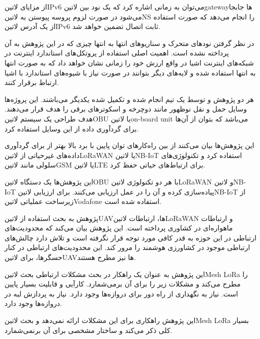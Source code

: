 از مزایای ‌لاتین{IPv6} می‌توان به زمانی اشاره کرد که یک نود بین ‌لاتین{gateway}ها جابجا می‌شود در صورت لزوم پروسه پیوستن به ‌لاتین{NS} را انجام می‌دهد که صورت استفاده از یک آدرس ‌لاتین{IPv6} ثابت اتصال تضمین خواهد شد.

در نظر گرفتن نودهای متحرک و سناریوهای انتها به انتها چیزی که در این پژوهش به آن پرداخته نشده است. اهمیت اصلی استفاده از پروتکل‌های استاندارد اینترنت در شبکه‌های اینترنت اشیا
در واقع ارزش خود را زمانی نشان خواهد داد که به صورت انتها به انتها استفاده شده و لایه‌های دیگر بتوانند در صورت نیاز با شیوه‌های استاندارد با اشیا ارتباط برقرار کنند.



هر دو پژوهش  و  توسط یک تیم انجام شده و تکمیل شده یکدیگر می‌باشند. این پروژه‌ها وسایل حمل و نقل نوظهور مانند دوچرخه و اسکوترهای برقی را هدف قرار می‌دهند.
هدف طراحی یک سیستم ‌لاتین{OBU} یا ‌لاتین{on-board unit} می‌باشد که بتوان از آن‌ها برای گردآوری داده از این وسایل استفاده کرد.

این پژوهش‌ها بیان می‌کنند از بین راه‌کارهای توان پایین با برد بالا بهتر از برای گردآوری داده‌های غیرحیاتی از ‌لاتین{LoRaWAN} یا ‌لاتین{NB-IoT} استفاده کرد
و تکنولوژی‌های سلولی مانند ‌لاتین{GSM} یا ‌لاتین{LTE} برای ارتباط‌های حیاتی حفظ کرد.

این پژوهش‌ها یک دستگاه ‌لاتین{OBU} با هر دو تکنولوژی ‌لاتین{LoRaWAN} و ‌لاتین{NB-IoT} پیاده‌سازی کرده و آن را در عمل ارزیابی می‌کنند.
برای ارزیابی ‌لاتین{NB-IoT} از زیرساخت عملیاتی ‌لاتین{Vodafone} استفاده شده است.


پژوهش  به بحث استفاده از ‌لاتین{UAV}ها، ارتباطات ‌لاتین{LoRaWAN} و ارتباطات ماهواره‌ای در کشاوری پرداخته است.
این پژوهش بیان می‌کند که محدودیت‌های ارتباطی در این حوزه به قدر کافی مورد توجه قرار نگرفته است و تلاش دارد چالش‌های ارتباطی موجود در کشاورزی هوشمند را مرور کند.
این محدودیت‌های ارتباطی در کنار حسگرها، برای ‌لاتین{UAV}ها نیز مطرح هستند.

این پژوهش به عنوان یک راهکار در بحث مشکلات ارتباطی بحث ‌لاتین{Mesh LoRa} را مطرح می‌کند و مشکلات زیر را برای آن برمی‌شمارد.
 کارآیی و قابلیت بسیار پایین است.
 نیاز به نگهداری از راه دور برای دروازه‌ها وجود دارد.
 نیاز به پردازش لبه در دروازه‌ها وجود دارد.

این پژوهش راهکاری برای این مشکلات ارائه نمی‌دهد و بحث ‌لاتین{Mesh LoRa} بسیار کلی ذکر می‌کند و ساختار مشخصی برای آن برنمی‌شمارد.

